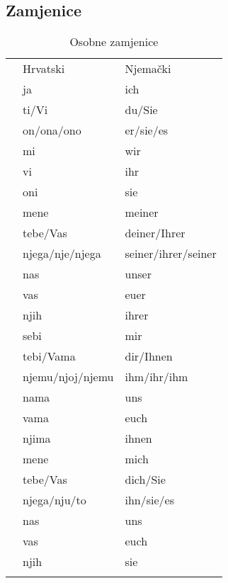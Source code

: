 \documentclass[12pt,german]{article}
\newenvironment{zamjenicetbl}[1]
{%
  \begin{table}[H]
    \caption{#1 zamjenice}
    \begin{tabular}{lll}
    \toprule
      & Hrvatski  &  Njemački \\
}{%
      \bottomrule
    \end{tabular}
  \end{table}}
\begin{document}
\begin{multicols}{2}
\section{Zamjenice}
\begin{zamjenicetbl}{Osobne}
  \zamjenicepadez{Nominativ}
    & ja         & ich \\
    & ti/Vi      & du/Sie \\
    & on/ona/ono & er/sie/es \\
    & mi         & wir \\
    & vi         & ihr \\
    & oni        & sie \\
  \endzamjenicepadez
  \zamjenicepadez{Genitiv}
    & mene         & meiner \\
    & tebe/Vas     & deiner/Ihrer \\
    & njega/nje/njega & seiner/ihrer/seiner \\
    & nas          & unser \\
    & vas          & euer \\
    & njih         & ihrer \\
  \endzamjenicepadez
  \zamjenicepadez{Dativ}
    & sebi               & mir \\
    & tebi/Vama          & dir/Ihnen \\
    & njemu/njoj/njemu   & ihm/ihr/ihm \\
    & nama               & uns \\
    & vama               & euch \\
    & njima              & ihnen \\
  \endzamjenicepadez
  \zamjenicepadez{Akuzativ}
    & mene         & mich       \\
    & tebe/Vas     & dich/Sie   \\
    & njega/nju/to & ihn/sie/es \\
    & nas          & uns        \\
    & vas          & euch       \\
    & njih         & sie        \\
  \endzamjenicepadez
\end{zamjenicetbl}


\end{multicols}
\end{document}
